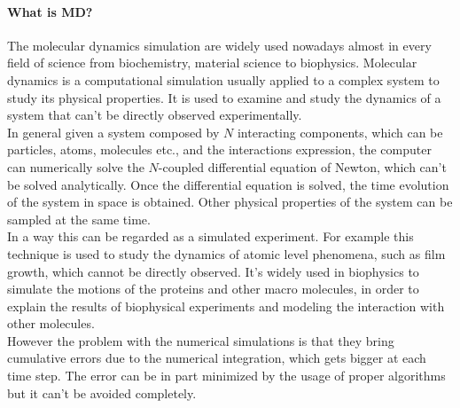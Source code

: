 \documentclass[10pt,a4paper,titlepage]{article}
\begin{document}
\paragraph*{What is MD?}
\noindent The molecular dynamics simulation are widely used nowadays almost in every field of science from biochemistry, material science to biophysics. Molecular dynamics is a computational simulation usually applied to a complex system to study its physical properties. It is used to examine and study the dynamics of a system that can't be directly observed experimentally.
\\
\noindent In general given a system composed by $N$ interacting components, which can be particles, atoms, molecules etc., and the interactions expression, the computer can numerically solve the $N$-coupled differential equation of Newton, which can't be solved analytically. Once the differential equation is solved, the time evolution of the system in space is obtained. Other physical properties of the system can be sampled at the same time. 
\\
\noindent In a way this can be regarded as a simulated experiment. For example this technique is used to study the dynamics of atomic level phenomena, such as film growth, which cannot be directly observed. It's widely used in biophysics to simulate the motions of the proteins and other macro molecules, in order to explain the results of biophysical experiments and modeling the interaction with other molecules.
\\  
\noindent However the problem with the numerical simulations is that they bring cumulative errors due to the numerical integration, which gets bigger at each time step. The error can be in part minimized by the usage of proper algorithms but it can't be avoided completely.  
\end{document}
